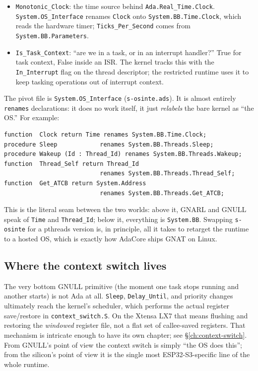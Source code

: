 \begin{itemize}
        in \texttt{System.BB.Time} for the absolute wake time. When the system
        timer fires at that time, the kernel makes the thread runnable.
  \item \texttt{Monotonic\_Clock}: the time source behind \texttt{Ada.Real\_Time.Clock}.
        \texttt{System.OS\_Interface} renames \texttt{Clock} onto
        \texttt{System.BB.Time.Clock}, which reads the hardware timer;
        \texttt{Ticks\_Per\_Second} comes from \texttt{System.BB.Parameters}.
  \item \texttt{Is\_Task\_Context}: ``are we in a task, or in an interrupt
        handler?'' True for task context, False inside an ISR. The kernel tracks
        this with the \texttt{In\_Interrupt} flag on the thread descriptor; the
        restricted runtime uses it to keep tasking operations out of interrupt
        context.
\end{itemize}

The pivot file is \texttt{System.OS\_Interface} (\texttt{s-osinte.ads}). It is
almost entirely \texttt{renames} declarations: it does no work itself, it just
\emph{relabels} the bare kernel as ``the OS.'' For example:

\begin{lstlisting}
function  Clock return Time renames System.BB.Time.Clock;
procedure Sleep            renames System.BB.Threads.Sleep;
procedure Wakeup (Id : Thread_Id) renames System.BB.Threads.Wakeup;
function  Thread_Self return Thread_Id
                           renames System.BB.Threads.Thread_Self;
function  Get_ATCB return System.Address
                           renames System.BB.Threads.Get_ATCB;
\end{lstlisting}

This is the literal seam between the two worlds: above it, GNARL and GNULL speak
of \texttt{Time} and \texttt{Thread\_Id}; below it, everything is
\texttt{System.BB}. Swapping \texttt{s-osinte} for a pthreads version is, in
principle, all it takes to retarget the runtime to a hosted OS, which is
exactly how AdaCore ships GNAT on Linux.

\subsection{Where the context switch lives}

The very bottom GNULL primitive (the moment one task stops running and another
starts) is not Ada at all. \texttt{Sleep}, \texttt{Delay\_Until}, and priority
changes ultimately reach the kernel's scheduler, which performs the actual
register save/restore in \texttt{context\_switch.S}. On the Xtensa LX7 that means
flushing and restoring the \emph{windowed} register file, not a flat set of
callee-saved registers. That mechanism is intricate enough to have its own
chapter; see \S\ref{ch:context-switch}. From GNULL's point of view the context
switch is simply ``the OS does this''; from the silicon's point of view it is the
single most ESP32-S3-specific line of the whole runtime.

